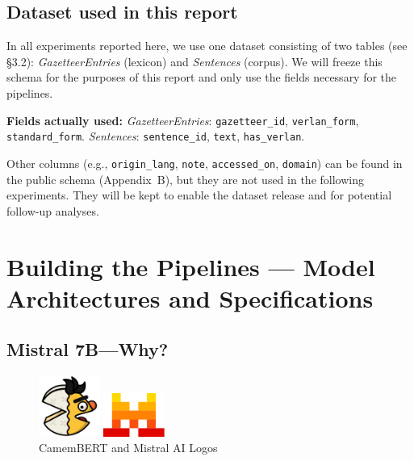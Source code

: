 \documentclass[12pt]{article}
\begin{document}
\subsection{Dataset used in this report}

In all experiments reported here, we use one dataset consisting of two tables (see §3.2): \textit{GazetteerEntries} (lexicon) and \textit{Sentences} (corpus). We will freeze this schema for the purposes of this report and only use the fields necessary for the pipelines.

\textbf{Fields actually used:} \textit{GazetteerEntries}: \texttt{gazetteer\_id}, \texttt{verlan\_form}, \texttt{standard\_form}. \; \textit{Sentences}: \texttt{sentence\_id}, \texttt{text}, \texttt{has\_verlan}.

Other columns (e.g., \texttt{origin\_lang}, \texttt{note}, \texttt{accessed\_on}, \texttt{domain}) can be found in the public schema (Appendix~B), but they are not used in the following experiments. They will be kept to enable the dataset release and for potential follow-up analyses.




\section{Building the Pipelines --- Model Architectures and Specifications}
\subsection{Mistral 7B\;---\;Why?}

\begin{figure}[htbp]
  \centering
  \begin{minipage}{0.45\linewidth}
    \centering
    \includegraphics[width=2cm]{figures/CamemBERT.png}
  \end{minipage}%
  \hfill
  \begin{minipage}{0.45\linewidth}
    \centering
    \includegraphics[width=2cm]{figures/mistral-logo.png}
  \end{minipage}
  \caption*{\scriptsize CamemBERT and Mistral AI Logos}
\end{figure}
\end{document}
